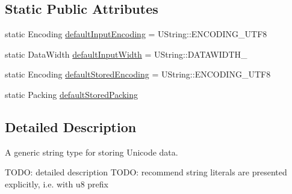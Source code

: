 \subsection*{Static Public Attributes}
\begin{DoxyCompactItemize}
\item 
static Encoding \hyperlink{classchaos_1_1str_1_1_u_string_a67b8f0f4465be46fa0035f617b438bce}{default\-Input\-Encoding} = U\-String\-::\-E\-N\-C\-O\-D\-I\-N\-G\-\_\-\-U\-T\-F8
\item 
static Data\-Width \hyperlink{classchaos_1_1str_1_1_u_string_af2df9ef0080748c1ca4802fd8285d5bc}{default\-Input\-Width} = U\-String\-::\-D\-A\-T\-A\-W\-I\-D\-T\-H\-\_
\item 
static Encoding \hyperlink{classchaos_1_1str_1_1_u_string_aca40d2341d3b5011070beede74fb3c05}{default\-Stored\-Encoding} = U\-String\-::\-E\-N\-C\-O\-D\-I\-N\-G\-\_\-\-U\-T\-F8
\item 
static Packing \hyperlink{classchaos_1_1str_1_1_u_string_a50b3a17a117ae0739d845489727745f5}{default\-Stored\-Packing}
\end{DoxyCompactItemize}


\subsection{Detailed Description}
A generic string type for storing Unicode data. 

T\-O\-D\-O\-: detailed description T\-O\-D\-O\-: recommend string literals are presented explicitly, i.\-e. with u8 prefix 

